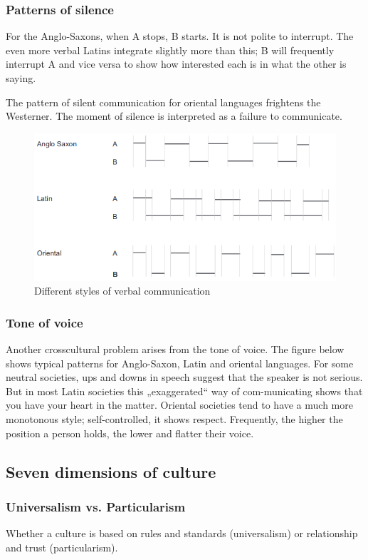 \subsubsection{Patterns of silence}
For the Anglo-Saxons, when A stops, B starts. It is not polite to interrupt. The even more verbal Latins integrate slightly more than this; B will frequently interrupt A and vice versa to show how interested each is in what the other is saying.

The pattern of silent communication for oriental languages frightens the Westerner. The moment of silence is interpreted as a failure to communicate.

\begin{figure}[H]
	\centering
	\includegraphics[width=.8\textwidth]{figures/silencePatternsCommunication.png}
	\caption{Different styles of verbal communication}
\end{figure}

\subsubsection{Tone of voice}
Another crosscultural problem arises from the tone of voice. The figure below shows typical patterns for Anglo-Saxon, Latin and oriental languages. For some neutral societies, ups and downs in speech suggest that the speaker is not serious. But in most Latin societies this „exaggerated“ way of com-municating shows that you have your heart in the matter. Oriental societies tend to have a much more monotonous style; self-controlled, it shows respect. Frequently, the higher the position a person holds, the lower and flatter their voice.

\subsection{Seven dimensions of culture}

\subsubsection{Universalism vs. Particularism}
Whether a culture is based on rules and standards (universalism) or relationship and trust (particularism).

